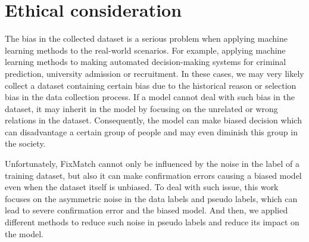 \section{Ethical consideration}
The bias in the collected dataset is a serious problem when applying machine learning methods to the real-world scenarios. For example, applying machine learning methods to making automated decision-making systems for criminal prediction, university admission or recruitment. In these cases, we may very likely collect a dataset containing certain bias due to the historical reason or selection bias in the data collection process. If a model cannot deal with such bias in the dataset, it may inherit in the model by focusing on the unrelated or wrong relations in the dataset. Consequently, the model can make biased decision which can disadvantage a certain group of people and may even diminish this group in the society. 

Unfortunately, FixMatch cannot only be influenced by the noise in the label of a training dataset, but also it can make confirmation errors causing a biased model even when the dataset itself is unbiased. To deal with such issue, this work focuses on the asymmetric noise in the data labels and pseudo labels, which can lead to severe confirmation error and the biased model. And then, we applied different methods to reduce such noise in pseudo labels and reduce its impact on the model.
